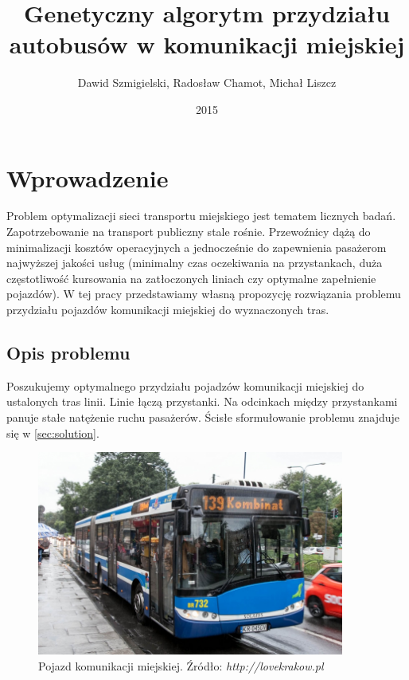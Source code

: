 \documentclass[polish,12pt]{aghthesis}
\author{Dawid Szmigielski, Radosław Chamot, Michał Liszcz}
\title{Genetyczny algorytm przydziału autobusów w komunikacji miejskiej}
\date{2015}
\begin{document}
\maketitle
\newpage

\tableofcontents
\newpage



\section{Wprowadzenie} \label{sec:intro}
Problem optymalizacji sieci transportu miejskiego jest tematem licznych badań. Zapotrzebowanie na transport publiczny stale rośnie. Przewoźnicy dążą do minimalizacji kosztów operacyjnych a jednocześnie do zapewnienia pasażerom najwyższej jakości usług (minimalny czas oczekiwania na przystankach, duża częstotliwość kursowania na zatłoczonych liniach czy optymalne zapełnienie pojazdów). W tej pracy przedstawiamy własną propozycję rozwiązania problemu przydziału pojazdów komunikacji miejskiej do wyznaczonych tras.

\subsection{Opis problemu}
Poszukujemy optymalnego przydziału pojadzów komunikacji miejskiej do ustalonych tras linii. Linie łączą przystanki. Na odcinkach między przystankami panuje stałe natężenie ruchu pasażerów. Ścisłe sformułowanie problemu znajduje się w \autoref{sec:solution}.

\begin{figure}[!htbp]
	\centering
	\includegraphics[width=0.9\textwidth]{351408454013_IMG_0581_770_512}
	\caption{Pojazd komunikacji miejskiej. Źródło: \textit{http://lovekrakow.pl}}
\end{figure}
\end{document}
